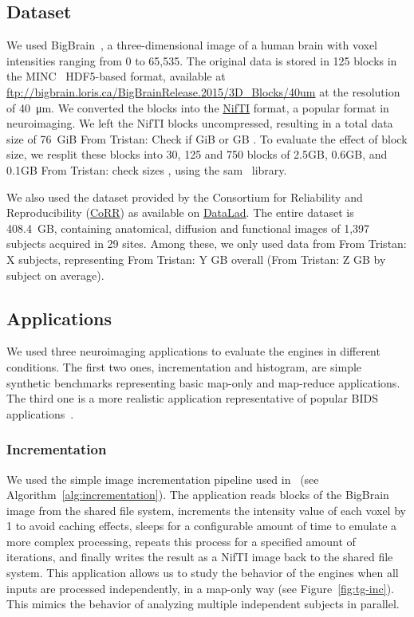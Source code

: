 \documentclass[conference]{IEEEtran}
\newcommand{\TG}[1]{\color{cyan}From Tristan: #1 \color{black}}
\begin{document}
\subsection{Dataset}

We used BigBrain~\cite{Amunts:13}, a three-dimensional image of a human
brain with voxel intensities ranging from 0 to 65,535. The original data is
stored in 125 blocks in the MINC~\cite{minc} HDF5-based format, available
at \url{ftp://bigbrain.loris.ca/BigBrainRelease.2015/3D_Blocks/40um} at the
resolution of \SI{40}{\micro\metre}. We converted the blocks into the
\href{https://nifti.nimh.nih.gov/nifti-1}{NifTI} format, a popular format
in neuroimaging. We left the NifTI blocks uncompressed, resulting in 
a total data size of 76~GiB \TG{Check if GiB or GB}. 
To evaluate the effect of block size, we resplit these blocks into 30, 125 and 750 blocks of 
2.5GB, 0.6GB, and
0.1GB \TG{check sizes}, using the sam~\cite{sam} library.

We also used the dataset provided by the Consortium for Reliability and
Reproducibility
(\href{http://fcon_1000.projects.nitrc.org/indi/CoRR/html/}{CoRR}) as
available on
\href{http://datasets.datalad.org/?dir=/corr/RawDataBIDS}{DataLad}. The
entire dataset is 408.4~GB, containing anatomical, diffusion and functional
images of 1,397 subjects acquired in 29 sites. Among these, we only used
data from \TG{X} subjects, representing \TG{Y}GB overall (\TG{Z}GB by
subject on average).


\subsection{Applications}

We used three neuroimaging applications to evaluate the engines in
different conditions. The first two ones, incrementation and histogram, are
simple synthetic benchmarks representing basic map-only and map-reduce applications.
The third one is a more realistic application representative of popular
BIDS applications~\cite{gorgolewski2017bids}. 

\subsubsection{Incrementation}
We used the simple image incrementation pipeline used
in~\cite{hayot2019performance} (see Algorithm~\ref{alg:incrementation}).
The application reads blocks of the BigBrain image from the shared file
system, increments the intensity value of each voxel by 1 to avoid caching
effects, sleeps for a configurable amount of time to emulate a more complex
processing, repeats this process for a specified amount of iterations, and
finally writes the result as a NifTI image back to the shared file system.
This application allows us to study the behavior of the engines when all
inputs are processed independently, in a map-only way (see
Figure~\ref{fig:tg-inc}). This mimics the behavior of analyzing multiple
independent subjects in parallel.
\end{document}
